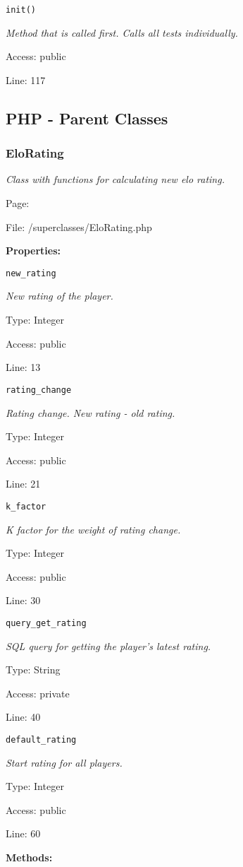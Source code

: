 \texttt{init()}

{\scriptsize
\textit{Method that is called first.
Calls all tests individually.}

Access: public

Line: 117

}

\subsection{PHP - Parent Classes}
\subsubsection{EloRating}\label{EloRating.php.doc}
\textit{Class with functions for calculating new elo rating.}

Page: \pageref{EloRating.php}

File: /superclasses/EloRating.php

\textbf{Properties:}

\texttt{new\_rating}

{\scriptsize
\textit{New rating of the player.}

Type: Integer

Access: public

Line: 13

}
\texttt{rating\_change}

{\scriptsize
\textit{Rating change.
New rating - old rating.}

Type: Integer

Access: public

Line: 21

}
\texttt{k\_factor}

{\scriptsize
\textit{K factor for the weight of rating change.}

Type: Integer

Access: public

Line: 30

}
\texttt{query\_get\_rating}

{\scriptsize
\textit{SQL query for getting the player's latest rating.}

Type: String

Access: private

Line: 40

}
\texttt{default\_rating}

{\scriptsize
\textit{Start rating for all players.}

Type: Integer

Access: public

Line: 60

}
\textbf{Methods:}


